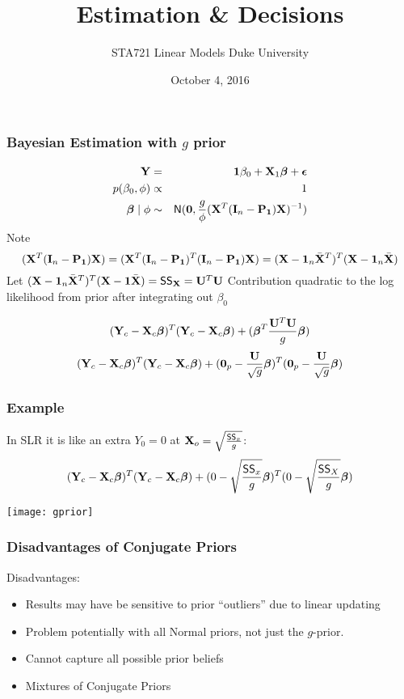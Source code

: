 \documentclass[]{beamer}
\title{Estimation \& Decisions}
\institute{Merlise Clyde}
\author{STA721 Linear Models Duke University}
\date{October 4, 2016}
\begin{document}
\maketitle

\begin{frame}
  \frametitle{Bayesian Estimation with $g$ prior}

\begin{eqnarray*}
\mathbf{Y} & = & \mathbf{1} \beta_0 + \mathbf{X}_1 \boldsymbol{\beta} + \boldsymbol{\epsilon} \\
p(\beta_0, \phi) & \propto & 1 \\  
\boldsymbol{\beta} \mid \phi & \sim & \textsf{N}(\mathbf{0}, \frac{g}{\phi} (\mathbf{X}^T (\mathbf{I}_n - \mathbf{P}_{\mathbf{1}}) \mathbf{X})^{-1})
\end{eqnarray*}\pause
Note $$(\mathbf{X}^T (\mathbf{I}_n - \mathbf{P}_{\mathbf{1}}) \mathbf{X}) = (\mathbf{X}^T (\mathbf{I}_n - \mathbf{P}_{\mathbf{1}})^T (\mathbf{I}_n
- \mathbf{P}_{\mathbf{1}}) \mathbf{X})  = (\mathbf{X} -\mathbf{1}_n \bar{\mathbf{X}}^T)^T (\mathbf{X} - \mathbf{1}_n \bar{\mathbf{X}}) $$
\pause
Let  $(\mathbf{X} -\mathbf{1}_n \bar{\mathbf{X}}^T)^T (\mathbf{X} - \mathbf{1} \bar{\mathbf{X}}) = \textsf{SS}_{\mathbf{X}} = \mathbf{U}^T \mathbf{U}$
\pause
Contribution quadratic to the log likelihood from prior after integrating out $\beta_0$

$$ ( \mathbf{Y}_c  - \mathbf{X}_c \boldsymbol{\beta})^T(\mathbf{Y}_c - \mathbf{X}_c\boldsymbol{\beta}) + ( \boldsymbol{\beta}^T\frac{\mathbf{U}^T \mathbf{U}}{g} \boldsymbol{\beta})   $$
\pause
$$ ( \mathbf{Y}_c  - \mathbf{X}_c \boldsymbol{\beta})^T(\mathbf{Y}_c - \mathbf{X}_c\boldsymbol{\beta}) + ( \mathbf{0}_p -
\frac{\mathbf{U}}{\sqrt{g}}\boldsymbol{\beta})^T(\mathbf{0}_p -  \frac{\mathbf{U}}{\sqrt{g}} \boldsymbol{\beta})   $$

\end{frame}


\begin{frame}\frametitle{Example}

In SLR it is like an extra $Y_0 = 0$ at $\mathbf{X}_o = \sqrt{\frac{\textsf{SS}_x}{g}}$:
$$ ( \mathbf{Y}_c  - \mathbf{X}_c \boldsymbol{\beta})^T(\mathbf{Y}_c - \mathbf{X}_c\boldsymbol{\beta}) + (0 - \sqrt{\frac{\textsf{SS}_x}{g}}\boldsymbol{\beta})^T (0 - \sqrt{\frac{\textsf{SS}_X}{g}} \boldsymbol{\beta})   $$
\pause  

\vspace{-.4in} 
\texttt{[image: gprior]}
\end{frame}




\begin{frame}
  \frametitle{Disadvantages of Conjugate Priors}
  Disadvantages: \pause
\begin{itemize}
\item Results  may have be sensitive to prior ``outliers'' due to
  linear updating \pause
\item Problem potentially with all Normal priors, not just the
  $g$-prior. \pause
\item Cannot capture all possible prior beliefs \pause
\item Mixtures of Conjugate Priors
\end{itemize}
\end{frame}
\end{document}
